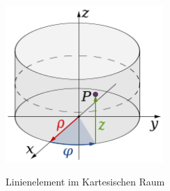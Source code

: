 

\begin{figure}
	\centering
	\includegraphics[width=6cm]{papers/geodaeten/Abbildungen/Linienelemente/LinZyl1}
	\caption{Linienelement im Kartesischen Raum}
	\label{geodaeten:figure:Linienelemente:Zylinder:figure2}
	\cite{geodaeten:polarkoordinaten}
\end{figure}

